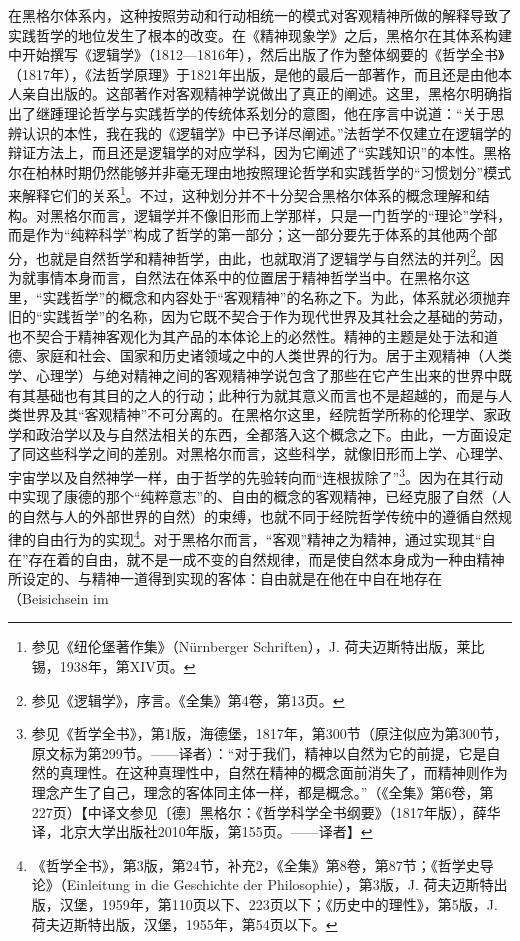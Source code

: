 在黑格尔体系内，这种按照劳动和行动相统一的模式对客观精神所做的解释导致了实践哲学的地位发生了根本的改变。在《精神现象学》之后，黑格尔在其体系构建中开始撰写《逻辑学》（1812—1816年），然后出版了作为整体纲要的《哲学全书》（1817年），《法哲学原理》于1821年出版，是他的最后一部著作，而且还是由他本人亲自出版的。这部著作对客观精神学说做出了真正的阐述。这里，黑格尔明确指出了继踵理论哲学与实践哲学的传统体系划分的意图，他在序言中说道：“关于思辨认识的本性，我在我的《逻辑学》中已予详尽阐述。”法哲学不仅建立在逻辑学的辩证方法上，而且还是逻辑学的对应学科，因为它阐述了“实践知识”的本性。黑格尔在柏林时期仍然能够并非毫无理由地按照理论哲学和实践哲学的“习惯划分”模式来解释它们的关系\footnote{参见《纽伦堡著作集》（Nürnberger Schriften），J. 荷夫迈斯特出版，莱比锡，1938年，第XIV页。}。不过，这种划分并不十分契合黑格尔体系的概念理解和结构。对黑格尔而言，逻辑学并不像旧形而上学那样，只是一门哲学的“理论”学科，而是作为“纯粹科学”构成了哲学的第一部分；这一部分要先于体系的其他两个部分，也就是自然哲学和精神哲学，由此，也就取消了逻辑学与自然法的并列\footnote{参见《逻辑学》，序言。《全集》第4卷，第13页。}。因为就事情本身而言，自然法在体系中的位置居于精神哲学当中。在黑格尔这里，“实践哲学”的概念和内容处于“客观精神”的名称之下。为此，体系就必须抛弃旧的“实践哲学”的名称，因为它既不契合于作为现代世界及其社会之基础的劳动，也不契合于精神客观化为其产品的本体论上的必然性。精神的主题是处于法和道德、家庭和社会、国家和历史诸领域之中的人类世界的行为。居于主观精神（人类学、心理学）与绝对精神之间的客观精神学说包含了那些在它产生出来的世界中既有其基础也有其目的之人的行动；此种行为就其意义而言也不是超越的，而是与人类世界及其“客观精神”不可分离的。在黑格尔这里，经院哲学所称的伦理学、家政学和政治学以及与自然法相关的东西，全都落入这个概念之下。由此，一方面设定了同这些科学之间的差别。对黑格尔而言，这些科学，就像旧形而上学、心理学、宇宙学以及自然神学一样，由于哲学的先验转向而“连根拔除了”\footnote{参见《哲学全书》，第1版，海德堡，1817年，第300节（原注似应为第300节，原文标为第299节。——译者）：“对于我们，精神以自然为它的前提，它是自然的真理性。在这种真理性中，自然在精神的概念面前消失了，而精神则作为理念产生了自己，理念的客体同主体一样，都是概念。”（《全集》第6卷，第227页）【中译文参见〔德〕黑格尔：《哲学科学全书纲要》（1817年版），薛华译，北京大学出版社2010年版，第155页。——译者】}。因为在其行动中实现了康德的那个“纯粹意志”的、自由的概念的客观精神，已经克服了自然（人的自然与人的外部世界的自然）的束缚，也就不同于经院哲学传统中的遵循自然规律的自由行为的实现\footnote{《哲学全书》，第3版，第24节，补充2，《全集》第8卷，第87节；《哲学史导论》（Einleitung in die Geschichte der Philosophie），第3版，J. 荷夫迈斯特出版，汉堡，1959年，第110页以下、223页以下；《历史中的理性》，第5版，J. 荷夫迈斯特出版，汉堡，1955年，第54页以下。}。对于黑格尔而言，“客观”精神之为精神，通过实现其“自在”存在着的自由，就不是一成不变的自然规律，而是使自然本身成为一种由精神所设定的、与精神一道得到实现的客体：自由就是在他在中自在地存在（Beisichsein im 